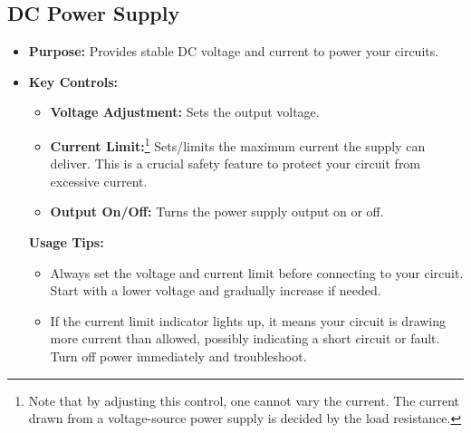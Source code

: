 \subsection*{DC Power Supply}
\begin{itemize}
	\item \textbf{Purpose:} Provides stable DC voltage and current to power your circuits.
	\item \textbf{Key Controls:}
	\begin{itemize}
		\item \textbf{Voltage Adjustment:} Sets the output voltage.
		\item \textbf{Current Limit:}\footnote{Note that by adjusting this control, one cannot vary the current. The current drawn from a voltage-source power supply is decided by the load resistance.} Sets/limits the maximum current the supply can deliver. This is a
		crucial safety feature to protect your circuit from excessive current.
		\item \textbf{Output On/Off:} Turns the power supply output on or off.
	\end{itemize}
	\textbf{Usage Tips:}
	\begin{itemize}
		\item Always set the voltage and current limit before connecting to your circuit.
		Start with a lower voltage and gradually increase if needed.
		\item If the current limit indicator lights up, it means your circuit is drawing more
		current than allowed, possibly indicating a short circuit or fault. Turn off power
		immediately and troubleshoot.
	\end{itemize}
\end{itemize}

